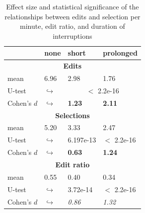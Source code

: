 \documentclass[times]{smrauth}
\begin{document}



\begin{table}[ht!]
\renewcommand{\arraystretch}{1.3}
\caption{Effect size and statistical significance of the relationships between edits and selection per minute, edit ratio, and duration of interruptions} %
\label{tbl:p_value2}
\centering
\begin{tabular}{l | p{0.7cm} | p{1.9cm} | p{1.9cm} } 
   & none & short &  prolonged  \\  
  \hline
  \multicolumn{4}{c}{\textbf{Edits}} \\
  \hline
  mean & 6.96 &	2.98 & 1.76 \\ 
   \cline{3-4} 
  U-test & $\hookrightarrow$ & \multicolumn{2}{c}{$<$ 2.2e-16}  \\

  \cline{3-4} 
  Cohen's $d$ & $\hookrightarrow$	& \textbf{1.23} & \textbf{2.11}   \\
  \hline
  
  
  \multicolumn{4}{c}{\textbf{Selections}} \\
  \hline 
  mean & 5.20 &	3.33 & 2.47 \\ 
   \cline{3-4} 
  U-test & $\hookrightarrow$ & 6.197e-13 & $<$ 2.2e-16 \\
  
  \cline{3-4} 
  Cohen's $d$ & $\hookrightarrow$	& \textbf{0.63} & \textbf{1.24}  \\  
  \hline
  \multicolumn{4}{c}{\textbf{Edit ratio}} \\
  \hline 
  mean & 0.55 & 0.40 & 0.34\\ 
   \cline{3-4} 
  U-test & $\hookrightarrow$ & 3.72e-14 & $<$ 2.2e-16  \\
  \cline{3-4} 
  Cohen's $d$ & $\hookrightarrow$ & \textit{0.86} & \textit{1.32}\\
\hline

\end{tabular}
\end{table}
\end{document}
